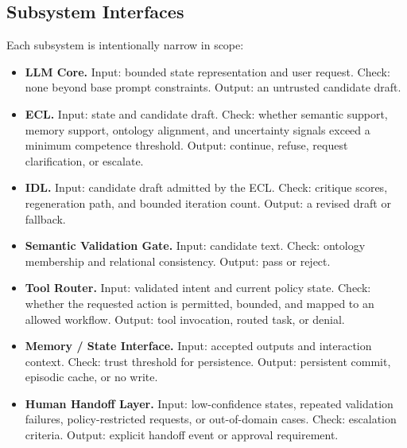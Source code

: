 \documentclass[11pt,a4paper]{article}
\begin{document}
\subsection{Subsystem Interfaces}
Each subsystem is intentionally narrow in scope:
\begin{itemize}
  \item \textbf{LLM Core.} Input: bounded state representation and user request. Check: none beyond base prompt constraints. Output: an untrusted candidate draft.
  \item \textbf{ECL.} Input: state and candidate draft. Check: whether semantic support, memory support, ontology alignment, and uncertainty signals exceed a minimum competence threshold. Output: continue, refuse, request clarification, or escalate.
  \item \textbf{IDL.} Input: candidate draft admitted by the ECL. Check: critique scores, regeneration path, and bounded iteration count. Output: a revised draft or fallback.
  \item \textbf{Semantic Validation Gate.} Input: candidate text. Check: ontology membership and relational consistency. Output: pass or reject.
  \item \textbf{Tool Router.} Input: validated intent and current policy state. Check: whether the requested action is permitted, bounded, and mapped to an allowed workflow. Output: tool invocation, routed task, or denial.
  \item \textbf{Memory / State Interface.} Input: accepted outputs and interaction context. Check: trust threshold for persistence. Output: persistent commit, episodic cache, or no write.
  \item \textbf{Human Handoff Layer.} Input: low-confidence states, repeated validation failures, policy-restricted requests, or out-of-domain cases. Check: escalation criteria. Output: explicit handoff event or approval requirement.
\end{itemize}
\end{document}
